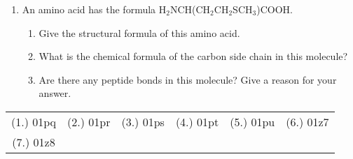 \begin{eocexercises}{}
\begin{enumerate}
\item{An amino acid has the formula H$_{2}$NCH(CH$_{2}$CH$_{2}$SCH$_{3}$)COOH.}
	\begin{enumerate}
	\item{Give the structural formula of this amino acid.}
	\item{What is the chemical formula of the carbon side chain in this molecule?}
	\item{Are there any peptide bonds in this molecule? Give a reason for your answer.}
	\end{enumerate}
\end{enumerate}
\par \practiceinfo
\par \begin{tabular}[h]{cccccc}
(1.)	01pq	&
(2.)	01pr	&
(3.)	01ps	&
(4.)	01pt	&
(5.)	01pu	&


(6.) 01z7	\\

(7.) 01z8	&


\end{tabular}
\end{eocexercises}

